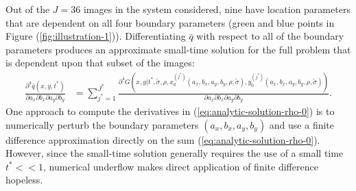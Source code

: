 Out of the $J=36$ images in the system considered, nine have location
parameters that are dependent on all four boundary parameters (green
and blue points in Figure (\ref{fig:illustration-1})). Differentiating
$\bar{q}$ with respect to all of the boundary parameters produces an
approximate small-time solution for the full problem that is dependent
upon that subset of the images:
\begin{align}
  \frac{\partial^4 \bar{q}(x, y, t^{*})}{\partial a_x
  \partial b_x \partial a_y \partial b_y} &= \sum_{j^*=1}^{J^*} \frac{\partial^4
                                            G(x,y|t^{*}, \tilde{\sigma}, \rho, x_0^{(j^*)}(a_x, b_x, a_y, b_y, \rho, \tilde{\sigma}),
                                            y_0^{(j^*)}(a_x, b_x, a_y, b_y, \rho, \tilde{\sigma}))} {\partial a_x \partial b_x
                                            \partial a_y \partial b_y}. \label{eq:analytic-solution-rho-0}
\end{align}
One approach to compute the derivatives in
(\ref{eq:analytic-solution-rho-0}) is to numerically perturb the
boundary parameters $(a_x,b_x,a_y,b_y)$ and use a finite difference
approximation directly on the sum
(\ref{eq:analytic-solution-rho-0}). However, since the small-time
solution generally requires the use of a small time $t^* << 1$,
numerical underflow makes direct application of finite difference
hopeless.

